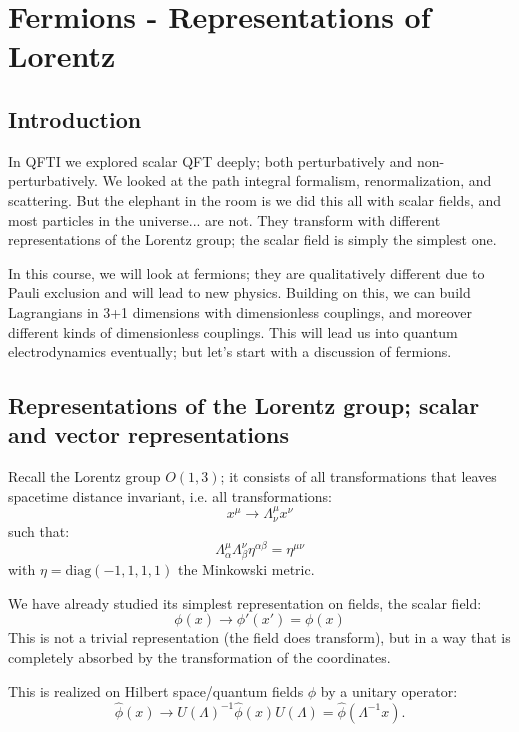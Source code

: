 \section{Fermions - Representations of Lorentz}

\subsection{Introduction}
In QFTI we explored scalar QFT deeply; both perturbatively and non-perturbatively. We looked at the path integral formalism, renormalization, and scattering. But the elephant in the room is we did this all with scalar fields, and most particles in the universe... are not. They transform with different representations of the Lorentz group; the scalar field is simply the simplest one. 

In this course, we will look at fermions; they are qualitatively different due to Pauli exclusion and will lead to new physics. Building on this, we can build Lagrangians in 3+1 dimensions with dimensionless couplings, and moreover different kinds of dimensionless couplings. This will lead us into quantum electrodynamics eventually; but let's start with a discussion of fermions.

\subsection{Representations of the Lorentz group; scalar and vector representations}
Recall the Lorentz group $O(1, 3)$; it consists of all transformations that leaves spacetime distance invariant, i.e. all transformations:
\begin{equation}
    x^\mu \to \Lambda^\mu_{\nu}x^\nu
\end{equation}
such that:
\begin{equation}
    \Lambda^{\mu}_\alpha\Lambda^\nu_\beta \eta^{\alpha\beta} = \eta^{\mu\nu}
\end{equation}
with $\eta = \text{diag}(-1, 1, 1, 1)$ the Minkowski metric.

We have already studied its simplest representation on fields, the scalar field:
\begin{equation}
    \phi(x) \to \phi'(x') = \phi(x)
\end{equation}
This is not a trivial representation (the field does transform), but in a way that is completely absorbed by the transformation of the coordinates.

This is realized on Hilbert space/quantum fields $\hat{\phi}$ by a unitary operator:
\begin{equation}
    \hat{\phi}(x) \to U(\Lambda)^{-1}\hat{\phi}(x)U(\Lambda) = \hat{\phi}(\Lambda^{-1}x).
\end{equation}

